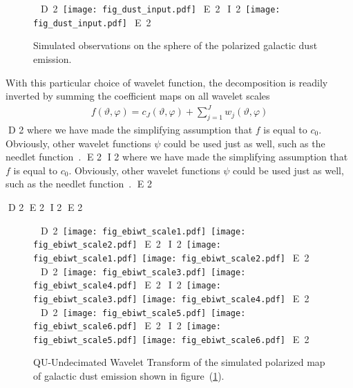 \begin{figure*}[htb]
\centerline{
\hbox{
D 2
 \texttt{[image: fig\_dust\_input.pdf]}
E 2
I 2
 \texttt{[image: fig\_dust\_input.pdf]}
E 2
}}
\caption{Simulated observations on the sphere of the polarized galactic dust emission.}
\label{fig_simu_pol_dust}
\end{figure*}

With this particular choice of wavelet function, the decomposition is readily inverted by summing the coefficient maps on all wavelet scales
 \begin{eqnarray}\label{IWT}
   f(\vartheta, \varphi) = c_{J}(\vartheta, \varphi) + \sum_{j=1}^{J} w_j(\vartheta, \varphi)
\end{eqnarray}
D 2
where we have made the simplifying assumption that $f$ is equal to $c_0$. Obviously, other wavelet functions $\psi$ could be used just as well, such as the needlet function~\cite{marinucci08}.
E 2
I 2
where we have made the simplifying assumption that $f$ is equal to $c_0$. Obviously, other wavelet functions $\psi$ could be used just as well, such as the needlet function~\citep{marinucci08}.
E 2

D 2
E 2
I 2
E 2

\begin{figure*}[htb]
\centerline{
\vbox{
 \hbox{
D 2
 \texttt{[image: fig\_ebiwt\_scale1.pdf]}
 \texttt{[image: fig\_ebiwt\_scale2.pdf]}
E 2
I 2
 \texttt{[image: fig\_ebiwt\_scale1.pdf]}
 \texttt{[image: fig\_ebiwt\_scale2.pdf]}
E 2
 }
 \hbox{
D 2
 \texttt{[image: fig\_ebiwt\_scale3.pdf]}
 \texttt{[image: fig\_ebiwt\_scale4.pdf]}
E 2
I 2
 \texttt{[image: fig\_ebiwt\_scale3.pdf]}
 \texttt{[image: fig\_ebiwt\_scale4.pdf]}
E 2
 }
  \hbox{
D 2
 \texttt{[image: fig\_ebiwt\_scale5.pdf]}
 \texttt{[image: fig\_ebiwt\_scale6.pdf]}
E 2
I 2
 \texttt{[image: fig\_ebiwt\_scale5.pdf]}
 \texttt{[image: fig\_ebiwt\_scale6.pdf]}
E 2
 }
  }
 }
\caption{QU-Undecimated Wavelet Transform of the simulated polarized map of galactic dust emission shown in figure~(\ref{fig_simu_pol_dust}).}
\label{fig_quwt_trans_dust}
\end{figure*}


